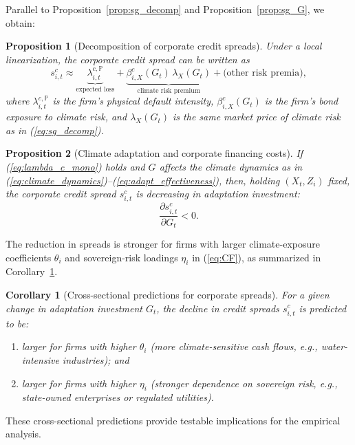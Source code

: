 \documentclass[12pt]{article}
\newtheorem{corollary}[theorem]{Corollary}
\newtheorem{proposition}{Proposition}
\begin{document}
Parallel to Proposition~\ref{prop:sg_decomp} and Proposition~\ref{prop:sg_G}, we obtain:

\begin{proposition}[Decomposition of corporate credit spreads]
\label{prop:sc_decomp}
Under a local linearization, the corporate credit spread can be written as
\begin{equation}
  s^c_{i,t} \approx \underbrace{\lambda^{c,\mathbb{P}}_{i,t}}_{\text{expected loss}}
                 + \underbrace{\beta^c_{i,X}(G_t)\, \lambda_X(G_t)}_{\text{climate risk premium}}
                 + \text{(other risk premia)},
  \label{eq:sc_decomp}
\end{equation}
where $\lambda^{c,\mathbb{P}}_{i,t}$ is the firm's physical default
intensity, $\beta^c_{i,X}(G_t)$ is the firm's bond exposure to climate
risk, and $\lambda_X(G_t)$ is the same market price of climate risk as in
(\ref{eq:sg_decomp}).
\end{proposition}

\begin{proposition}[Climate adaptation and corporate financing costs]
\label{prop:sc_G}
If (\ref{eq:lambda_c_mono}) holds and $G$ affects the climate dynamics as
in (\ref{eq:climate_dynamics})--(\ref{eq:adapt_effectiveness}), then,
holding $(X_t,Z_i)$ fixed, the corporate credit spread $s^c_{i,t}$ is
decreasing in adaptation investment:
\begin{equation}
  \frac{\partial s^c_{i,t}}{\partial G_t} < 0.
  \label{eq:dsc_dG}
\end{equation}

\end{proposition}

The reduction in spreads is stronger for firms with larger
climate-exposure coefficients $\theta_i$ and sovereign-risk loadings
$\eta_i$ in (\ref{eq:CF}), as summarized in Corollary~\ref{cor:sc_heterogeneity}.

\begin{corollary}[Cross-sectional predictions for corporate spreads]
\label{cor:sc_heterogeneity}
For a given change in adaptation investment $G_t$, the decline in credit
spreads $s^c_{i,t}$ is predicted to be:
\begin{enumerate}
  \item larger for firms with higher $\theta_i$ (more climate-sensitive
        cash flows, e.g., water-intensive industries); and
  \item larger for firms with higher $\eta_i$ (stronger dependence on
        sovereign risk, e.g., state-owned enterprises or regulated
        utilities).
\end{enumerate}

\end{corollary}
These cross-sectional predictions provide testable implications for the
empirical analysis.
\end{document}

